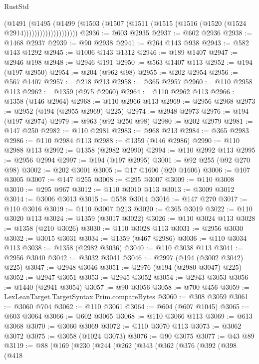 \begin{lexlean}{RustStd}
\begin{coremodule}
                        (@1491
                          (@1495
                            (@1499
                              (@1503
                                (@1507 (@1511 (@1515 (@1516 (@1520 (@1524 @2914))))))))))))))))))))
@2936 := @603 @2935
@2937 := @602 @2936
@2938 := @1468 @2937
@2939 := @90 @2938
@2941 := @264 @143 @938
@2943 := @582 @143 @1292
@2945 := @1006 @143 @1312
@2946 := @189 @1407
@2947 := @2946 @198
@2948 := @2946 @191
@2950 := @563 @1407 @113
@2952 := @194 (@197 @2950)
@2954 := @204 (@962 @98)
@2955 := @202 @2954
@2956 := @567 @1407
@2957 := @218 @213
@2958 := @365 @2957
@2960 := @110 @2958 @113
@2962 := @1359 (@975 @2960)
@2964 := @110 @2962 @113
@2966 := @1358 (@146 @2964)
@2968 := @110 @2966 @113
@2969 := @2956 @2968
@2973 := @2952 (@194 (@2955 @2969) @225)
@2974 := @2948 @2973
@2976 := @194 (@197 @2974)
@2979 := @963 (@92 @250 @98)
@2980 := @202 @2979
@2981 := @147 @250
@2982 := @110 @2981
@2983 := @968 @213
@2984 := @365 @2983
@2986 := @110 @2984 @113
@2988 := @1359 (@146 @2986)
@2990 := @110 @2988 @113
@2992 := @1358 (@2982 @2990)
@2994 := @110 @2992 @113
@2995 := @2956 @2994
@2997 := @194 (@197 @2995)
@3001 := @92 @255 (@92 @270 @98)
@3002 := @202 @3001
@3005 := @17 @1606 (@20 @1606)
@3006 := @107 @3005
@3007 := @147 @255
@3008 := @295 @3007
@3009 := @110 @3008
@3010 := @295 @967
@3012 := @110 @3010 @113
@3013 := @3009 @3012
@3014 := @3006 @3013
@3015 := @558 @3014
@3016 := @147 @270
@3017 := @110 @3016
@3019 := @110 @3007 @213
@3020 := @365 @3019
@3022 := @110 @3020 @113
@3024 := @1359 (@3017 @3022)
@3026 := @110 @3024 @113
@3028 := @1358 (@210 @3026)
@3030 := @110 @3028 @113
@3031 := @2956 @3030
@3032 := @3015 @3031
@3034 := @1359 (@467 @2986)
@3036 := @110 @3034 @113
@3038 := @1358 (@2982 @3036)
@3040 := @110 @3038 @113
@3041 := @2956 @3040
@3042 := @3032 @3041
@3046 := @2997 (@194 (@3002 @3042) @225)
@3047 := @2948 @3046
@3051 := @2976 (@194 (@2980 @3047) @225)
@3052 := @2947 @3051
@3053 := @2945 @3052
@3054 := @2943 @3053
@3056 := @1440 (@2941 @3054)
@3057 := @90 @3056
@3058 := @700 @456
@3059 := LexLeanTarget.TargetSyntax.Prim.compareBytes
@3060 := @308 @3059
@3061 := @3060 @704
@3062 := @110 @3061
@3064 := @604 (@607 @1045)
@3065 := @603 @3064
@3066 := @602 @3065
@3068 := @110 @3066 @113
@3069 := @613 @3068
@3070 := @3060 @3069
@3072 := @110 @3070 @113
@3073 := @3062 @3072
@3075 := @3058 (@1024 @3073)
@3076 := @90 @3075
@3077 := @43 @89
@3119 := @88
    (@169
      (@230
        (@244
          (@262
            (@343
              (@362
                (@376
                  (@392
                    (@398
                      (@418

\end{coremodule}
\end{lexlean}
